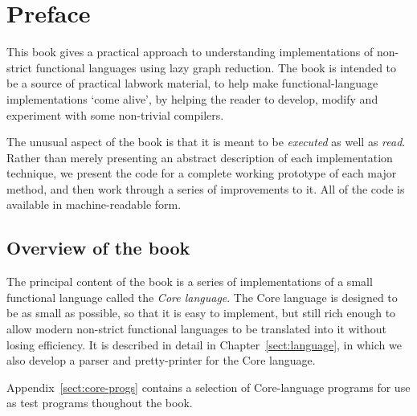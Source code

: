 \chapter*{Preface}

This book gives a practical approach to understanding implementations
of non-strict functional languages using lazy graph reduction.  The
book is intended to be a source of practical labwork material, to help
make functional-language implementations `come alive', by helping
the reader to develop, modify and experiment with some non-trivial
compilers.

The unusual aspect of the book is that it is meant to be {\em
executed} as well as {\em read}.  Rather than merely presenting an
abstract description of each implementation technique, we present the
code for a complete working prototype of each major method, and then
work through a series of improvements to it.  All of the code is available
in machine-readable form.

\section*{Overview of the book}

The principal content of the book is a series of implementations of
a small functional language called the {\em Core language}.  The Core language
is designed to be as small as possible, so that it is easy to implement,
but still rich enough to allow modern non-strict functional languages to
be translated into it without losing efficiency.  It is described in
detail in Chapter~\ref{sect:language}, in which we also develop a parser
and pretty-printer for the Core language.

Appendix~\ref{sect:core-progs}
contains a selection of Core-language programs for use as test programs
thoughout the book.

